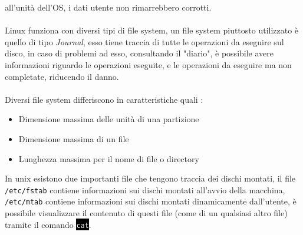 \documentclass[12pt, letterpaper]{article}
\newcommand{\code}[1]{\colorbox{light-gray}{\texttt{#1}}}
\newcommand{\shelll}[1]{\colorbox{black}{\textcolor{white}{\texttt{#1}}}}
\newcommand{\acc}{\\\hphantom{}\\}
\begin{document}
 all'unità dell'OS, i dati utente non rimarrebbero corrotti. \acc 
 Linux funziona con diversi tipi di file system, un file system piuttosto utilizzato è quello di tipo \textit{Journal}, esso 
 tiene traccia di tutte le operazioni da eseguire sul disco, in caso di problemi ad esso, consultando il "diario", è possibile 
 avere informazioni riguardo le operazioni eseguite, e le operazioni da eseguire ma non completate, riducendo il danno.\acc 
 Diversi file system differiscono in caratteristiche quali : \begin{itemize}
    \item Dimensione massima delle unità di una partizione 
    \item Dimensione massima di un file
    \item Lunghezza massima per il nome di file o directory
 \end{itemize}
 In unix esistono due importanti file che tengono traccia dei dischi montati, il file \code{/etc/fstab} contiene informazioni 
 sui dischi montati all'avvio della macchina, \code{/etc/mtab} contiene informazioni sui dischi montati dinamicamente dall'utente, è 
 possibile visualizzare il contenuto di questi file (come di un qualsiasi altro file) tramite il comando \shelll{cat}.
\end{document}
